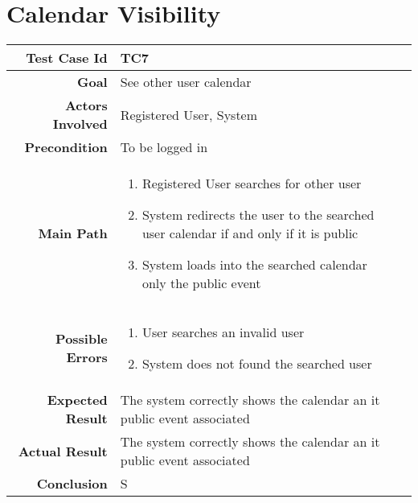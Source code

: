 \section{Calendar Visibility}
\begin{tabularx}{\linewidth}{|r|X|X|}
\hline   {\bf Test Case Id} &  TC7\\
  \hline  {\bf Goal} & See other user calendar\\
  \hline  {\bf Actors Involved} & Registered User, System\\
  \hline  {\bf Precondition} & To be logged in\\ 
   \hline  {\bf Main Path} & \begin{enumerate} 
   \item Registered User searches for other user
    \item System redirects the user to the searched user calendar if and only if it is public
    \item System loads into the searched calendar only the public event
   \end{enumerate}\\
   \hline  {\bf Possible Errors} & \begin{enumerate} 
   \item User searches an invalid user
   \item System does not found the searched user
   \end{enumerate}\\
  \hline  {\bf Expected Result} & The system correctly shows the calendar an it public event associated\\
  \hline  {\bf Actual Result} & The system correctly shows the calendar an it public event associated\\
  \hline  {\bf Conclusion} & S\\
  \hline
  
\end{tabularx}

